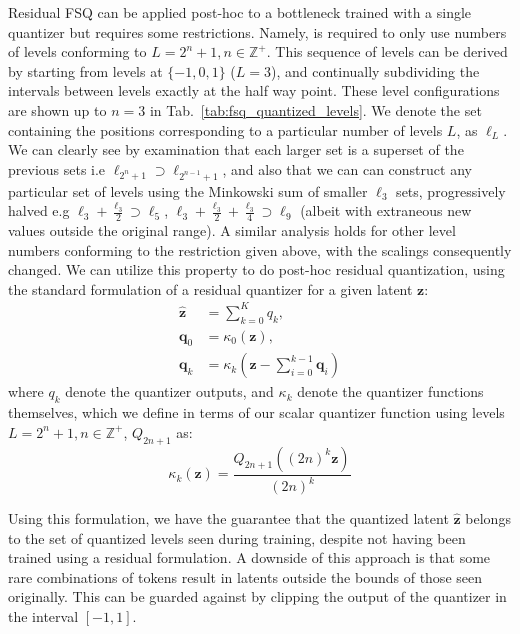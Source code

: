 \documentclass{article} %
\begin{document}

Residual FSQ can be applied post-hoc to a bottleneck trained with a single quantizer but requires some restrictions. Namely, is required to only use numbers of levels conforming to $L=2^n +1, n \in \mathbb{Z}^+$. This sequence of levels can be derived by starting from levels at $\{-1,0,1\}$ ($L=3$), and continually subdividing the intervals between levels exactly at the half way point. These level configurations are shown up to $n=3$ in Tab.~\ref{tab:fsq_quantized_levels}. We denote the set containing the positions corresponding to a particular number of levels $L$, as $\ell_L$. We can clearly see by examination that each larger set is a superset of the previous sets i.e $\ell_{2^n +1} \supset \ell_{2^{n-1} +1}$, and also that we can can construct any particular set of levels using the Minkowski sum of smaller $\ell_3$ sets, progressively halved e.g $\ell_3 + \frac{\ell_3}{2} \supset \ell_5$, $\ell_3 + \frac{\ell_3}{2} + \frac{\ell_3}{4} \supset \ell_9$ (albeit with extraneous new values outside the original range). A similar analysis holds for other level numbers conforming to the restriction given above, with the scalings consequently changed.  We can utilize this property to do post-hoc residual quantization, using the standard formulation of a residual quantizer for a given latent $\mathbf{z}$:
\begin{align}
\mathbf{\hat{z}} &= \sum_{k=0}^K q_k, \nonumber \\
\mathbf{q}_0 &= \kappa_0(\mathbf{z}), \nonumber \\
\mathbf{q}_k &= \kappa_k(\mathbf{z}-\sum_{i=0}^{k-1} \mathbf{q}_{i})
\end{align}
where $q_k$ denote the quantizer outputs, and $\kappa_k$ denote the quantizer functions themselves, which we define in terms of our scalar quantizer function using levels $L=2^n +1, n \in \mathbb{Z}^+$, $Q_{2n+1}$ as:
\begin{equation}
\kappa_k (\mathbf{z})= \frac{Q_{2n+1}((2n)^k \mathbf{z})}{(2n)^k}
\end{equation}



Using this formulation, we have the guarantee that the quantized latent $\mathbf{\hat{z}}$ belongs to the set of quantized levels seen during training, despite not having been trained using a residual formulation. A downside of this approach is that some rare combinations of tokens result in latents outside the bounds of those seen originally. This can be guarded against by clipping the output of the quantizer in the interval $[-1,1]$.%
\end{document}
